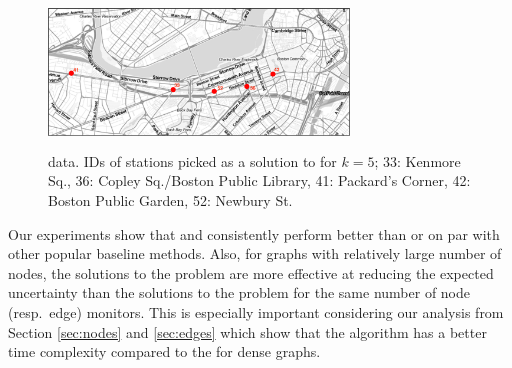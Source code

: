 \begin{figure}
	\centering
	\includegraphics[width=8cm, height=4cm]{figures/hubway_stations_5.pdf}
	\caption{{\hubway} data. IDs of stations picked as a solution to {\nodeproblem}
	for $k=5$;
	33: Kenmore Sq., 36: Copley Sq./Boston Public Library, 41: Packard's Corner, 
	42: Boston Public Garden, 52: Newbury St.                        }
	\label{fig:hubway_stations}
\end{figure}


 Our experiments show that  {\nodegreedy} and  {\edgegreedy} 
consistently perform better than or on par with other popular baseline methods. Also, for 
graphs with relatively large number of nodes, the solutions to the {\nodeproblem} problem 
are more effective at reducing
the expected uncertainty than the solutions to the {\edgeproblem} problem for the same number of
node (resp.\ edge) monitors.
This is
especially important considering our analysis from Section \ref{sec:nodes} and \ref{sec:edges} which show
that the {\nodegreedy} algorithm has a better time complexity compared to the {\edgegreedy} for dense graphs.

